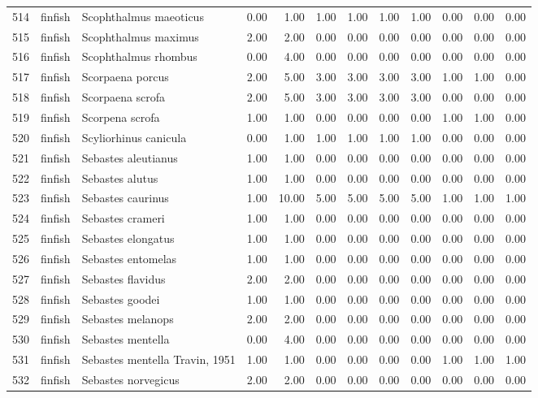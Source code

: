 \begin{table}[ht]
\begin{tabular}{rllrrrrrrrrr}
  514 & finfish & Scophthalmus maeoticus & 0.00 & 1.00 & 1.00 & 1.00 & 1.00 & 1.00 & 0.00 & 0.00 & 0.00 \\ 
  515 & finfish & Scophthalmus maximus & 2.00 & 2.00 & 0.00 & 0.00 & 0.00 & 0.00 & 0.00 & 0.00 & 0.00 \\ 
  516 & finfish & Scophthalmus rhombus & 0.00 & 4.00 & 0.00 & 0.00 & 0.00 & 0.00 & 0.00 & 0.00 & 0.00 \\ 
  517 & finfish & Scorpaena porcus & 2.00 & 5.00 & 3.00 & 3.00 & 3.00 & 3.00 & 1.00 & 1.00 & 0.00 \\ 
  518 & finfish & Scorpaena scrofa & 2.00 & 5.00 & 3.00 & 3.00 & 3.00 & 3.00 & 0.00 & 0.00 & 0.00 \\ 
  519 & finfish & Scorpena scrofa & 1.00 & 1.00 & 0.00 & 0.00 & 0.00 & 0.00 & 1.00 & 1.00 & 0.00 \\ 
  520 & finfish & Scyliorhinus canicula & 0.00 & 1.00 & 1.00 & 1.00 & 1.00 & 1.00 & 0.00 & 0.00 & 0.00 \\ 
  521 & finfish & Sebastes aleutianus & 1.00 & 1.00 & 0.00 & 0.00 & 0.00 & 0.00 & 0.00 & 0.00 & 0.00 \\ 
  522 & finfish & Sebastes alutus & 1.00 & 1.00 & 0.00 & 0.00 & 0.00 & 0.00 & 0.00 & 0.00 & 0.00 \\ 
  523 & finfish & Sebastes caurinus & 1.00 & 10.00 & 5.00 & 5.00 & 5.00 & 5.00 & 1.00 & 1.00 & 1.00 \\ 
  524 & finfish & Sebastes crameri & 1.00 & 1.00 & 0.00 & 0.00 & 0.00 & 0.00 & 0.00 & 0.00 & 0.00 \\ 
  525 & finfish & Sebastes elongatus & 1.00 & 1.00 & 0.00 & 0.00 & 0.00 & 0.00 & 0.00 & 0.00 & 0.00 \\ 
  526 & finfish & Sebastes entomelas & 1.00 & 1.00 & 0.00 & 0.00 & 0.00 & 0.00 & 0.00 & 0.00 & 0.00 \\ 
  527 & finfish & Sebastes flavidus & 2.00 & 2.00 & 0.00 & 0.00 & 0.00 & 0.00 & 0.00 & 0.00 & 0.00 \\ 
  528 & finfish & Sebastes goodei & 1.00 & 1.00 & 0.00 & 0.00 & 0.00 & 0.00 & 0.00 & 0.00 & 0.00 \\ 
  529 & finfish & Sebastes melanops & 2.00 & 2.00 & 0.00 & 0.00 & 0.00 & 0.00 & 0.00 & 0.00 & 0.00 \\ 
  530 & finfish & Sebastes mentella & 0.00 & 4.00 & 0.00 & 0.00 & 0.00 & 0.00 & 0.00 & 0.00 & 0.00 \\ 
  531 & finfish & Sebastes mentella Travin, 1951 & 1.00 & 1.00 & 0.00 & 0.00 & 0.00 & 0.00 & 1.00 & 1.00 & 1.00 \\ 
  532 & finfish & Sebastes norvegicus & 2.00 & 2.00 & 0.00 & 0.00 & 0.00 & 0.00 & 0.00 & 0.00 & 0.00 \\ 

\end{tabular}
\end{table}

